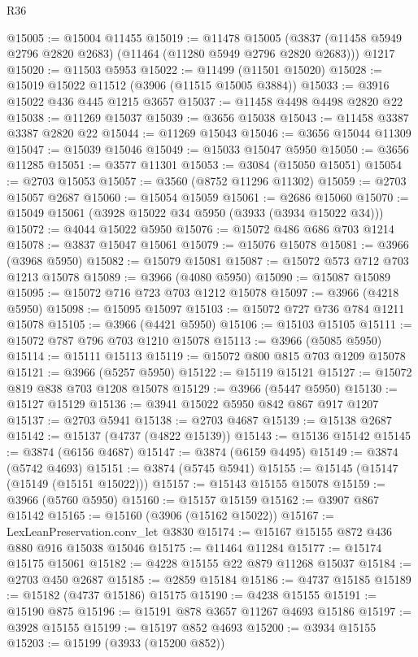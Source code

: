 \begin{lexlean}{R36}
\begin{coremodule}
@15005 := @15004 @11455
@15019 := @11478
    @15005
    (@3837 (@11458 @5949 @2796 @2820 @2683) (@11464 (@11280 @5949 @2796 @2820 @2683)))
    @1217
@15020 := @11503 @5953
@15022 := @11499 (@11501 @15020)
@15028 := @15019 @15022 @11512 (@3906 (@11515 @15005 @3884))
@15033 := @3916 @15022 @436 @445 @1215 @3657
@15037 := @11458 @4498 @4498 @2820 @22
@15038 := @11269 @15037
@15039 := @3656 @15038
@15043 := @11458 @3387 @3387 @2820 @22
@15044 := @11269 @15043
@15046 := @3656 @15044 @11309
@15047 := @15039 @15046
@15049 := @15033 @15047 @5950
@15050 := @3656 @11285
@15051 := @3577 @11301
@15053 := @3084 (@15050 @15051)
@15054 := @2703 @15053
@15057 := @3560 (@8752 @11296 @11302)
@15059 := @2703 @15057 @2687
@15060 := @15054 @15059
@15061 := @2686 @15060
@15070 := @15049 @15061 (@3928 @15022 @34 @5950 (@3933 (@3934 @15022 @34)))
@15072 := @4044 @15022 @5950
@15076 := @15072 @486 @686 @703 @1214
@15078 := @3837 @15047 @15061
@15079 := @15076 @15078
@15081 := @3966 (@3968 @5950)
@15082 := @15079 @15081
@15087 := @15072 @573 @712 @703 @1213 @15078
@15089 := @3966 (@4080 @5950)
@15090 := @15087 @15089
@15095 := @15072 @716 @723 @703 @1212 @15078
@15097 := @3966 (@4218 @5950)
@15098 := @15095 @15097
@15103 := @15072 @727 @736 @784 @1211 @15078
@15105 := @3966 (@4421 @5950)
@15106 := @15103 @15105
@15111 := @15072 @787 @796 @703 @1210 @15078
@15113 := @3966 (@5085 @5950)
@15114 := @15111 @15113
@15119 := @15072 @800 @815 @703 @1209 @15078
@15121 := @3966 (@5257 @5950)
@15122 := @15119 @15121
@15127 := @15072 @819 @838 @703 @1208 @15078
@15129 := @3966 (@5447 @5950)
@15130 := @15127 @15129
@15136 := @3941 @15022 @5950 @842 @867 @917 @1207
@15137 := @2703 @5941
@15138 := @2703 @4687
@15139 := @15138 @2687
@15142 := @15137 (@4737 (@4822 @15139))
@15143 := @15136 @15142
@15145 := @3874 (@6156 @4687)
@15147 := @3874 (@6159 @4495)
@15149 := @3874 (@5742 @4693)
@15151 := @3874 (@5745 @5941)
@15155 := @15145 (@15147 (@15149 (@15151 @15022)))
@15157 := @15143 @15155 @15078
@15159 := @3966 (@5760 @5950)
@15160 := @15157 @15159
@15162 := @3907 @867 @15142
@15165 := @15160 (@3906 (@15162 @15022))
@15167 := LexLeanPreservation.conv_let @3830
@15174 := @15167 @15155 @872 @436 @880 @916 @15038 @15046
@15175 := @11464 @11284
@15177 := @15174 @15175 @15061
@15182 := @4228 @15155 @22 @879 @11268 @15037
@15184 := @2703 @450 @2687
@15185 := @2859 @15184
@15186 := @4737 @15185
@15189 := @15182 (@4737 @15186) @15175
@15190 := @4238 @15155
@15191 := @15190 @875
@15196 := @15191 @878 @3657 @11267 @4693 @15186
@15197 := @3928 @15155
@15199 := @15197 @852 @4693
@15200 := @3934 @15155
@15203 := @15199 (@3933 (@15200 @852))

\end{coremodule}
\end{lexlean}
